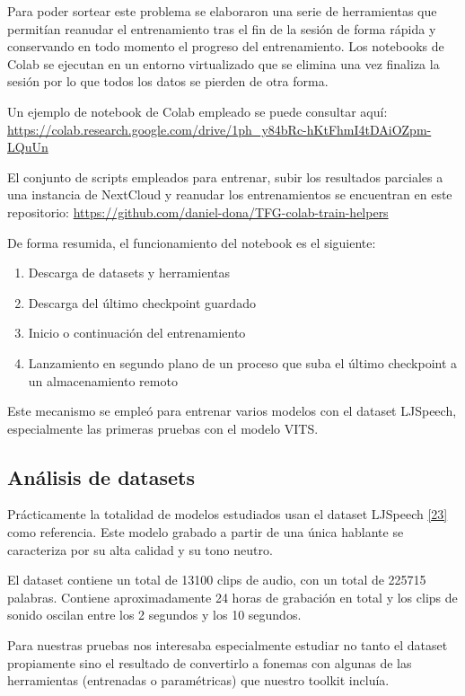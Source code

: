 Para poder sortear este problema se elaboraron una serie de herramientas que permitían reanudar el entrenamiento tras el fin de la sesión de forma rápida y conservando en todo momento el progreso del entrenamiento. Los notebooks de Colab se ejecutan en un entorno virtualizado que se elimina una vez finaliza la sesión por lo que todos los datos se pierden de otra forma.

Un ejemplo de notebook de Colab empleado se puede consultar aquí: \url{https://colab.research.google.com/drive/1ph_y84bRc-hKtFhmI4tDAiOZpm-LQuUn}

El conjunto de scripts empleados para entrenar, subir los resultados parciales a una instancia de NextCloud y reanudar los entrenamientos se encuentran en este repositorio: \url{https://github.com/daniel-dona/TFG-colab-train-helpers}

De forma resumida, el funcionamiento del notebook es el siguiente:

\begin{enumerate}
    \item Descarga de datasets y herramientas
    \item Descarga del último checkpoint guardado
    \item Inicio o continuación del entrenamiento
    \item Lanzamiento en segundo plano de un proceso que suba el último checkpoint a un almacenamiento remoto
\end{enumerate}

Este mecanismo se empleó para entrenar varios modelos con el dataset LJSpeech, especialmente las primeras pruebas con el modelo VITS.

\newpage 
\subsection{Análisis de datasets}
\label{Análisis de datasets}

Prácticamente la totalidad de modelos estudiados usan el dataset LJSpeech \hyperref[AX_1]{[23]} como referencia. Este modelo grabado a partir de una única hablante se caracteriza por su alta calidad y su tono neutro.

El dataset contiene un total de 13100 clips de audio, con un total de 225715 palabras. Contiene aproximadamente 24 horas de grabación en total y los clips de sonido oscilan entre los 2 segundos y los 10 segundos.

Para nuestras pruebas nos interesaba especialmente estudiar no tanto el dataset propiamente sino el resultado de convertirlo a fonemas con algunas de las herramientas (entrenadas o paramétricas) que nuestro toolkit incluía. 

